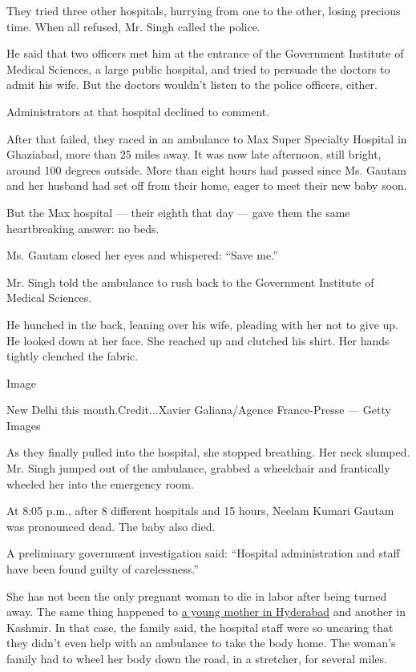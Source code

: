 They tried three other hospitals, hurrying from one to the other, losing
precious time. When all refused, Mr. Singh called the police.

He said that two officers met him at the entrance of the Government
Institute of Medical Sciences, a large public hospital, and tried to
persuade the doctors to admit his wife. But the doctors wouldn't listen
to the police officers, either.

Administrators at that hospital declined to comment.

After that failed, they raced in an ambulance to Max Super Specialty
Hospital in Ghaziabad, more than 25 miles away. It was now late
afternoon, still bright, around 100 degrees outside. More than eight
hours had passed since Ms. Gautam and her husband had set off from their
home, eager to meet their new baby soon.

But the Max hospital --- their eighth that day --- gave them the same
heartbreaking answer: no beds.

Ms. Gautam closed her eyes and whispered: ``Save me.''

Mr. Singh told the ambulance to rush back to the Government Institute of
Medical Sciences.

He hunched in the back, leaning over his wife, pleading with her not to
give up. He looked down at her face. She reached up and clutched his
shirt. Her hands tightly clenched the fabric.

Image

New Delhi this month.Credit...Xavier Galiana/Agence France-Presse ---
Getty Images

As they finally pulled into the hospital, she stopped breathing. Her
neck slumped. Mr. Singh jumped out of the ambulance, grabbed a
wheelchair and frantically wheeled her into the emergency room.

At 8:05 p.m., after 8 different hospitals and 15 hours, Neelam Kumari
Gautam was pronounced dead. The baby also died.

A preliminary government investigation said: ``Hospital administration
and staff have been found guilty of carelessness.''

She has not been the only pregnant woman to die in labor after being
turned away. The same thing happened to
\href{https://www.thehansindia.com/telangana/telangana-denial-of-medical-aid-to-a-pregnant-woman-high-court-seeks-details-on-criminal-cases-filed-against-doctors-624837?infinitescroll=1https://timesofindia.indiatimes.com/city/hyderabad/6-women-docs-held-liable-for-death-of-gadwal-mother-baby/articleshow/76016968.cms}{a
young mother in Hyderabad} and another in Kashmir. In that case, the
family said, the hospital staff were so uncaring that they didn't even
help with an ambulance to take the body home. The woman's family had to
wheel her body down the road, in a stretcher, for several miles.

